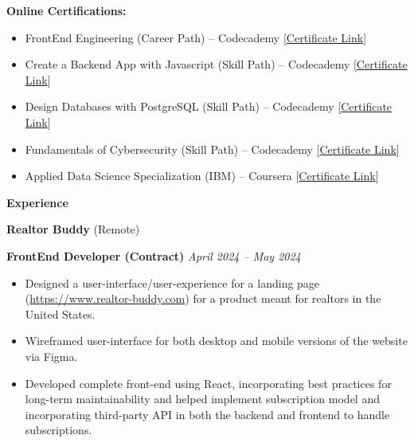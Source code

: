 \documentclass[12pt, a4paper]{article}
\begin{document}
\vspace{12pt}
\textbf{Online Certifications:}
\begin{itemize}[noitemsep, topsep=0pt, partopsep=0pt, parsep=0pt]
	\item FrontEnd Engineering (Career Path) -- Codecademy \hfill [\href{https://www.codecademy.com/profiles/candyclaws99/certificates/2682884a0719474f96407efe432fdd87}{Certificate Link}]
	\item Create a Backend App with Javascript (Skill Path) -- Codecademy \hfill [\href{https://www.codecademy.com/profiles/candyclaws99/certificates/5cb678013709022f5b908913}{Certificate Link}]
	\item  Design Databases with PostgreSQL (Skill Path) -- Codecademy \hfill [{\href{https://www.codecademy.com/profiles/candyclaws99/certificates/5f64e3b492de0000131ecbe0}{Certificate Link}}]
	\item Fundamentals of Cybersecurity (Skill Path) -- Codecademy \hfill [\href{https://www.codecademy.com/profiles/candyclaws99/certificates/06984a073b064e61879cca3e82a9b3d2}{Certificate Link}]
	\item Applied Data Science Specialization (IBM) -- Coursera \hfill [\href{https://coursera.org/share/d030e4f8979b8718d0b067ae3f467d33}{Certificate Link}]
\end{itemize}




\begin{center}
	\large\textbf{Experience}
\end{center}

\textbf{Realtor Buddy} \hfill (Remote)

\textbf{FrontEnd Developer (Contract)} \hfill \textit{April 2024 -- May 2024}
\begin{itemize}[noitemsep, topsep=0pt, partopsep=0pt, parsep=0pt]
	\item Designed a user-interface/user-experience for a landing page (\url{https://www.realtor-buddy.com}) for a product meant for realtors in the United States.
	\item Wireframed user-interface for both desktop and mobile versions of the website via Figma.
	\item Developed complete front-end using React, incorporating best practices for long-term maintainability and helped implement subscription model and incorporating third-party API in both the backend and frontend to handle subscriptions.
\end{itemize}
\end{document}
